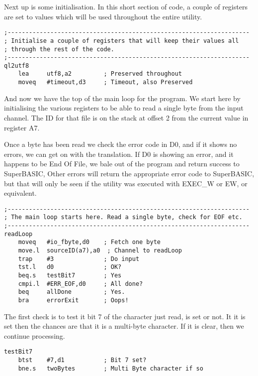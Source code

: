 Next up is some initialisation. In this short section of code, a couple
of registers are set to values which will be used throughout the entire
utility.

\begin{lstlisting}[firstnumber=last,caption={Ql2utf8: Initialising constant registers}]
;--------------------------------------------------------------------
; Initialise a couple of registers that will keep their values all
; through the rest of the code.
;--------------------------------------------------------------------
ql2utf8
    lea     utf8,a2         ; Preserved throughout
    moveq   #timeout,d3     ; Timeout, also Preserved

\end{lstlisting}

And now we have the top of the main loop for the program. We start
here by initialising the various registers to be able to read a single
byte from the input channel. The ID for that file is on the stack
at offset 2 from the current value in register A7.

Once a byte has been read we check the error code in D0, and if it
shows no errors, we can get on with the translation. If D0 is showing
an error, and it happens to be End Of File, we bale out of the program
and return success to SuperBASIC, Other errors will return the appropriate
error code to SuperBASIC, but that will only be seen if the utility
was executed with EXEC\_W or EW, or equivalent.

\begin{lstlisting}[firstnumber=last,caption={Ql2utf8: Top of the loop - reading bytes}]
;--------------------------------------------------------------------
; The main loop starts here. Read a single byte, check for EOF etc.
;--------------------------------------------------------------------
readLoop
    moveq   #io_fbyte,d0    ; Fetch one byte
    move.l  sourceID(a7),a0  ; Channel to readLoop
    trap    #3              ; Do input
    tst.l   d0              ; OK?
    beq.s   testBit7        ; Yes
    cmpi.l  #ERR_EOF,d0     ; All done?
    beq     allDone         ; Yes.
    bra     errorExit       ; Oops!
\end{lstlisting}

The first check is to test it bit 7 of the character just read, is
set or not. It it is set then the chances are that it is a multi-byte
character. If it is clear, then we continue processing.

\begin{lstlisting}[firstnumber=last,caption={Ql2utf8: One byte? Or More?}]
testBit7
    btst    #7,d1           ; Bit 7 set?
    bne.s   twoBytes        ; Multi Byte character if so
\end{lstlisting}

